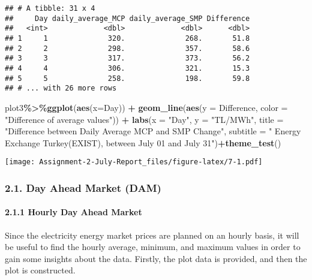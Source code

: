\documentclass[
]{article}
\newenvironment{Shaded}{\begin{snugshade}}{\end{snugshade}}
\newcommand{\DataTypeTok}[1]{\textcolor[rgb]{0.13,0.29,0.53}{#1}}
\newcommand{\KeywordTok}[1]{\textcolor[rgb]{0.13,0.29,0.53}{\textbf{#1}}}
\newcommand{\NormalTok}[1]{#1}
\newcommand{\OperatorTok}[1]{\textcolor[rgb]{0.81,0.36,0.00}{\textbf{#1}}}
\newcommand{\StringTok}[1]{\textcolor[rgb]{0.31,0.60,0.02}{#1}}
\begin{document}
\begin{verbatim}
## # A tibble: 31 x 4
##     Day daily_average_MCP daily_average_SMP Difference
##   <int>             <dbl>             <dbl>      <dbl>
## 1     1              320.              268.       51.8
## 2     2              298.              357.       58.6
## 3     3              317.              373.       56.2
## 4     4              306.              321.       15.3
## 5     5              258.              198.       59.8
## # ... with 26 more rows
\end{verbatim}

\begin{Shaded}
\begin{Highlighting}[]
\NormalTok{plot3}\OperatorTok{\%\textgreater{}\%}\KeywordTok{ggplot}\NormalTok{(}\KeywordTok{aes}\NormalTok{(}\DataTypeTok{x=}\NormalTok{Day)) }\OperatorTok{+}\StringTok{ }\KeywordTok{geom\_line}\NormalTok{(}\KeywordTok{aes}\NormalTok{(}\DataTypeTok{y =}\NormalTok{ Difference, }\DataTypeTok{color =} \StringTok{"Difference of average values"}\NormalTok{)) }\OperatorTok{+}
\StringTok{     }\KeywordTok{labs}\NormalTok{(}\DataTypeTok{x =} \StringTok{"Day"}\NormalTok{, }\DataTypeTok{y =} \StringTok{"TL/MWh"}\NormalTok{,}
          \DataTypeTok{title =} \StringTok{"Difference between Daily Average MCP and SMP Change"}\NormalTok{,}
          \DataTypeTok{subtitle =} \StringTok{" Energy Exchange Turkey(EXIST), between July 01 and July 31"}\NormalTok{)}\OperatorTok{+}\KeywordTok{theme\_test}\NormalTok{()}
\end{Highlighting}
\end{Shaded}

\texttt{[image: Assignment-2-July-Report\_files/figure-latex/7-1.pdf]}

\hypertarget{day-ahead-market-dam}{%
\subsubsection{2.1. Day Ahead Market (DAM)}\label{day-ahead-market-dam}}

\hypertarget{hourly-day-ahead-market}{%
\paragraph{2.1.1 Hourly Day Ahead
Market}\label{hourly-day-ahead-market}}

Since the electricity energy market prices are planned on an hourly
basis, it will be useful to find the hourly average, minimum, and
maximum values in order to gain some insights about the data. Firstly,
the plot data is provided, and then the plot is constructed.
\end{document}
